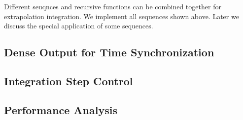 Different seuqnces and recursive functions can be combined together for extrapolation integration. We implement all sequences shown above. Later we discuss the special application of some sequences.\hypertarget{index_dense_sec}{}\subsection{Dense Output for Time Synchronization}\label{index_dense_sec}
\hypertarget{index_step_sec}{}\subsection{Integration Step Control}\label{index_step_sec}
\hypertarget{index_perf_sec}{}\subsection{Performance Analysis}\label{index_perf_sec}
